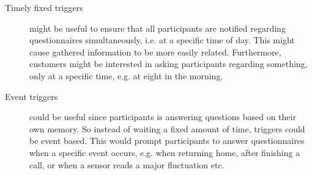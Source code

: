 \begin{description}
    \item[Timely fixed triggers] might be useful to ensure that all participants are notified regarding questionnaires simultaneously, i.e. at a specific time of day. This might cause gathered information to be more easily related. Furthermore, customers might be interested in asking participants regarding something, only at a specific time, e.g. at eight in the morning. 

    \item[Event triggers] could be useful since participants is answering questions based on their own memory. So instead of waiting a fixed amount of time, triggers could be event based. This would prompt participants to answer questionnaires when a specific event occurs, e.g. when returning home, after finishing a call, or when a sensor reads a major fluctuation etc.    
\end{description}    
